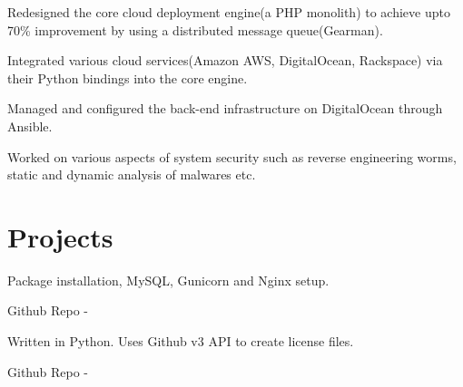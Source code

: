 \documentclass[]{deedy-resume-openfont}
\begin{document}
\begin{minipage}[t]{0.66\textwidth}
\begin{tightemize}
\item Redesigned the core cloud deployment engine(a PHP monolith) to achieve upto 70\% improvement by using a distributed message queue(Gearman).
\item Integrated various cloud services(Amazon AWS, DigitalOcean, Rackspace) via their Python bindings into the core engine.
\item Managed and configured the back-end infrastructure on DigitalOcean through Ansible.
\end{tightemize}
\sectionsep

\begin{tightemize}
\item Worked on various aspects of system security such as reverse engineering worms, static and dynamic analysis of malwares etc.
\end{tightemize}
\sectionsep


\section{Projects}

\begin{tightemize}
\item Package installation, MySQL, Gunicorn and Nginx setup.
\end{tightemize}
Github Repo - \href{https://www.github.com/pattu777/Ansible-Django}{}
\sectionsep

\begin{tightemize}
\item Written in Python. Uses Github v3 API to create license files.
\end{tightemize}
Github Repo - \href{https://www.github.com/pattu777/Lucy/}{}
\sectionsep

\end{minipage} 
\end{document}
